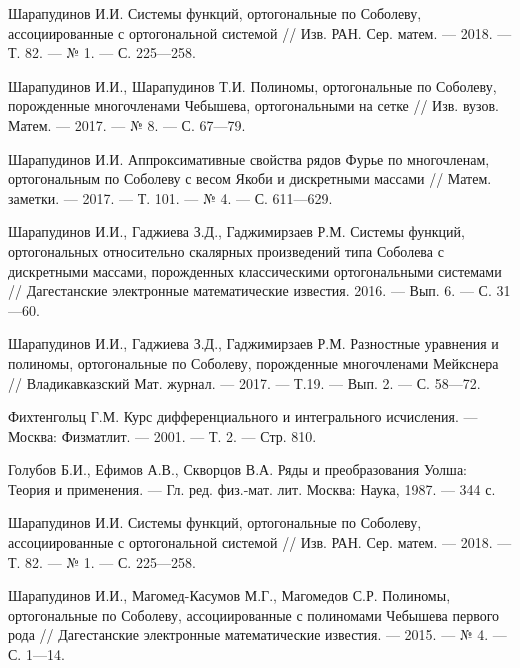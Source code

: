 \begin{thebibliography}{20}
Шарапудинов И.И. Системы функций, ортогональные по Соболеву, ассоциированные с ортогональной системой // Изв. РАН. Сер. матем. --- 2018. --- Т. 82. --- № 1. --- С. 225---258.



Шарапудинов И.И., Шарапудинов Т.И. Полиномы, ортогональные по Соболеву, порожденные многочленами Чебышева, ортогональными на сетке // Изв. вузов. Матем. --- 2017. --- № 8. --- С. 67---79.




Шарапудинов И.И. Аппроксимативные свойства рядов Фурье по многочленам, ортогональным по Соболеву с весом Якоби и дискретными массами // Матем. заметки. --- 2017. --- Т. 101. --- № 4. --- С. 611---629.



Шарапудинов И.И., Гаджиева З.Д., Гаджимирзаев Р.М. Системы функций, ортогональных относительно скалярных произведений типа Соболева с дискретными массами, порожденных классическими ортогональными системами // Дагестанские электронные математические известия. 2016. --- Вып. 6. --- С. 31---60.




Шарапудинов И.И., Гаджиева З.Д., Гаджимирзаев Р.М.
Разностные уравнения и полиномы, ортогональные по Соболеву, порожденные многочленами Мейкснера //
Владикавказский Мат. журнал. --- 2017. --- Т.19. --- Вып. 2. --- С. 58---72.




Фихтенгольц Г.М.
Курс дифференциального и интегрального исчисления. --- Москва: Физматлит. --- 2001. --- Т. 2. --- Стр. 810.




Голубов Б.И., Ефимов А.В., Скворцов В.А. Ряды и преобразования Уолша: Теория и применения. --- Гл. ред. физ.-мат. лит. Москва: Наука, 1987. --- 344 с.



Шарапудинов И.И. Системы функций, ортогональные по Соболеву, ассоциированные с ортогональной системой // Изв. РАН. Сер. матем. --- 2018. --- Т. 82. --- № 1. --- С. 225---258.



Шарапудинов И.И., Магомед-Касумов М.Г., Магомедов С.Р. Полиномы, ортогональные по Соболеву, ассоциированные с полиномами Чебышева первого рода // Дагестанские электронные математические известия. --- 2015. --- № 4. --- С. 1---14.




\end{thebibliography}
